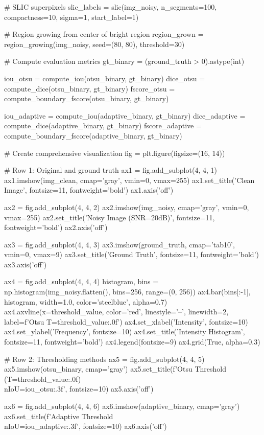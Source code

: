 \documentclass[a4paper, 11pt]{article}
\begin{document}
\begin{pycode}
# SLIC superpixels
slic_labels = slic(img_noisy, n_segments=100, compactness=10, sigma=1, start_label=1)

# Region growing from center of bright region
region_grown = region_growing(img_noisy, seed=(80, 80), threshold=30)

# Compute evaluation metrics
gt_binary = (ground_truth > 0).astype(int)

iou_otsu = compute_iou(otsu_binary, gt_binary)
dice_otsu = compute_dice(otsu_binary, gt_binary)
fscore_otsu = compute_boundary_fscore(otsu_binary, gt_binary)

iou_adaptive = compute_iou(adaptive_binary, gt_binary)
dice_adaptive = compute_dice(adaptive_binary, gt_binary)
fscore_adaptive = compute_boundary_fscore(adaptive_binary, gt_binary)

# Create comprehensive visualization
fig = plt.figure(figsize=(16, 14))

# Row 1: Original and ground truth
ax1 = fig.add_subplot(4, 4, 1)
ax1.imshow(img_clean, cmap='gray', vmin=0, vmax=255)
ax1.set_title('Clean Image', fontsize=11, fontweight='bold')
ax1.axis('off')

ax2 = fig.add_subplot(4, 4, 2)
ax2.imshow(img_noisy, cmap='gray', vmin=0, vmax=255)
ax2.set_title('Noisy Image (SNR=20dB)', fontsize=11, fontweight='bold')
ax2.axis('off')

ax3 = fig.add_subplot(4, 4, 3)
ax3.imshow(ground_truth, cmap='tab10', vmin=0, vmax=9)
ax3.set_title('Ground Truth', fontsize=11, fontweight='bold')
ax3.axis('off')

ax4 = fig.add_subplot(4, 4, 4)
histogram, bins = np.histogram(img_noisy.flatten(), bins=256, range=(0, 256))
ax4.bar(bins[:-1], histogram, width=1.0, color='steelblue', alpha=0.7)
ax4.axvline(x=threshold_value, color='red', linestyle='--', linewidth=2, label=f'Otsu T={threshold_value:.0f}')
ax4.set_xlabel('Intensity', fontsize=10)
ax4.set_ylabel('Frequency', fontsize=10)
ax4.set_title('Intensity Histogram', fontsize=11, fontweight='bold')
ax4.legend(fontsize=9)
ax4.grid(True, alpha=0.3)

# Row 2: Thresholding methods
ax5 = fig.add_subplot(4, 4, 5)
ax5.imshow(otsu_binary, cmap='gray')
ax5.set_title(f'Otsu Threshold (T={threshold_value:.0f})\\nIoU={iou_otsu:.3f}', fontsize=10)
ax5.axis('off')

ax6 = fig.add_subplot(4, 4, 6)
ax6.imshow(adaptive_binary, cmap='gray')
ax6.set_title(f'Adaptive Threshold\\nIoU={iou_adaptive:.3f}', fontsize=10)
ax6.axis('off')


\end{pycode}
\end{document}
